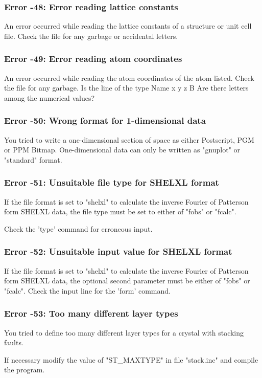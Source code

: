 \subsubsection{Error -48: Error reading lattice constants}
\par
An error occurred while reading the lattice constants of a structure 
or unit cell file. Check the file for any garbage or accidental letters. 
\subsubsection{Error -49: Error reading atom coordinates}
\par
An error occurred while reading the atom coordinates of the atom 
listed.  Check the file for any garbage. Is the line of the type 
Name x y z B 
Are there letters among the numerical values? 
\subsubsection{Error -50: Wrong format for 1-dimensional data}
\par
You tried to write a one-dimensional section of space as either 
Postscript, PGM or PPM Bitmap. One-dimensional data can only be 
written as "gnuplot" or "standard" format. 
\subsubsection{Error -51: Unsuitable file type for SHELXL format}
\par
If the file format is set to "shelxl" to calculate the inverse Fourier of 
Patterson form SHELXL data, the file type must be set to either of 
"fobs" or "fcalc". 
\par
Check the 'type' command for erroneous input. 
\subsubsection{Error -52: Unsuitable input value for SHELXL format}
\par
If the file format is set to "shelxl" to calculate the inverse Fourier of 
Patterson form SHELXL data, the optional second parameter must be either of 
"fobs" or "fcalc". 
Check the input line for the 'form' command. 
\subsubsection{Error -53: Too many different layer types}
\par
You tried to define too many different layer types for a crystal with 
stacking faults. 
\par
If necessary modify the value of "ST\_MAXTYPE" in file "stack.inc" 
and compile the program. 

